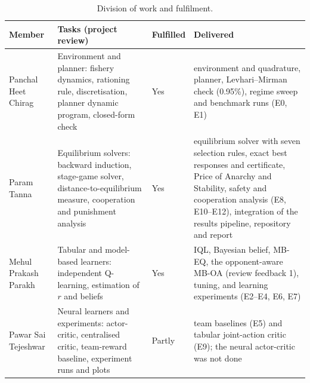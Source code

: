 \documentclass{article}
\begin{document}
\begin{table}[H]
  \centering
  \caption{Division of work and fulfilment.}
  \label{tab:work}
  \small
  \begin{tabular}{p{3.0cm}p{5.0cm}p{1.2cm}p{5.5cm}}
    \toprule
    Member & Tasks (project review) & Fulfilled & Delivered \\
    \midrule
    Panchal Heet Chirag & Environment and planner: fishery dynamics, rationing rule, discretisation, planner dynamic program, closed-form check & Yes & environment and quadrature, planner, Levhari--Mirman check (0.95\%), regime sweep and benchmark runs (E0, E1) \\
    Param Tanna & Equilibrium solvers: backward induction, stage-game solver, distance-to-equilibrium measure, cooperation and punishment analysis & Yes & equilibrium solver with seven selection rules, exact best responses and certificate, Price of Anarchy and Stability, safety and cooperation analysis (E8, E10--E12), integration of the results pipeline, repository and report \\
    Mehul Prakash Parakh & Tabular and model-based learners: independent Q-learning, estimation of $r$ and beliefs & Yes & IQL, Bayesian belief, MB-EQ, the opponent-aware MB-OA (review feedback 1), tuning, and learning experiments (E2--E4, E6, E7) \\
    Pawar Sai Tejeshwar & Neural learners and experiments: actor-critic, centralised critic, team-reward baseline, experiment runs and plots & Partly & team baselines (E5) and tabular joint-action critic (E9); the neural actor-critic was not done \\
    \bottomrule
  \end{tabular}
\end{table}
\end{document}

